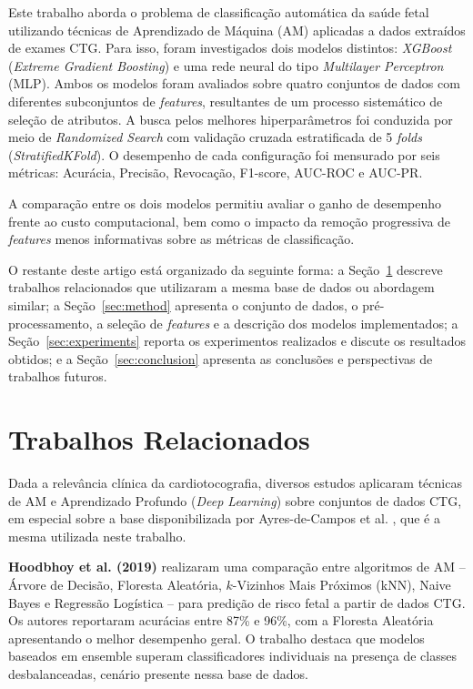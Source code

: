 \documentclass[12pt, a4paper]{article}
\begin{document}
Este trabalho aborda o problema de classificação automática da saúde fetal utilizando
técnicas de Aprendizado de Máquina (AM) aplicadas a dados extraídos de exames CTG. Para isso,
foram investigados dois modelos distintos: \textit{XGBoost} (\textit{Extreme Gradient Boosting}) e
uma rede neural do tipo \textit{Multilayer Perceptron} (MLP). Ambos os modelos foram avaliados
sobre quatro conjuntos de dados com diferentes subconjuntos de \textit{features}, resultantes de
um processo sistemático de seleção de atributos. A busca pelos melhores hiperparâmetros foi
conduzida por meio de \textit{Randomized Search} com validação cruzada estratificada de 5
\textit{folds} (\textit{StratifiedKFold}). O desempenho de cada configuração foi mensurado por
seis métricas: Acurácia, Precisão, Revocação, F1-score, AUC-ROC e AUC-PR.

A comparação entre os dois modelos permitiu avaliar o ganho de desempenho frente ao custo
computacional, bem como o impacto da remoção progressiva de \textit{features} menos informativas
sobre as métricas de classificação.

O restante deste artigo está organizado da seguinte forma: a Seção~\ref{sec:related} descreve
trabalhos relacionados que utilizaram a mesma base de dados ou abordagem similar; a
Seção~\ref{sec:method} apresenta o conjunto de dados, o pré-processamento, a seleção de
\textit{features} e a descrição dos modelos implementados; a Seção~\ref{sec:experiments}
reporta os experimentos realizados e discute os resultados obtidos; e a
Seção~\ref{sec:conclusion} apresenta as conclusões e perspectivas de trabalhos futuros.

\section{Trabalhos Relacionados}
\label{sec:related}

Dada a relevância clínica da cardiotocografia, diversos estudos aplicaram técnicas de AM e
Aprendizado Profundo (\textit{Deep Learning}) sobre conjuntos de dados CTG, em especial sobre
a base disponibilizada por Ayres-de-Campos et al. \cite{campos2000}, que é a mesma utilizada
neste trabalho.

\textbf{Hoodbhoy et al. (2019)} \cite{hoodbhoy2019} realizaram uma comparação entre algoritmos
de AM -- Árvore de Decisão, Floresta Aleatória, $k$-Vizinhos Mais Próximos (kNN), Naive Bayes e
Regressão Logística -- para predição de risco fetal a partir de dados CTG. Os autores reportaram
acurácias entre 87\% e 96\%, com a Floresta Aleatória apresentando o melhor desempenho geral.
O trabalho destaca que modelos baseados em ensemble superam classificadores individuais na
presença de classes desbalanceadas, cenário presente nessa base de dados.
\end{document}
